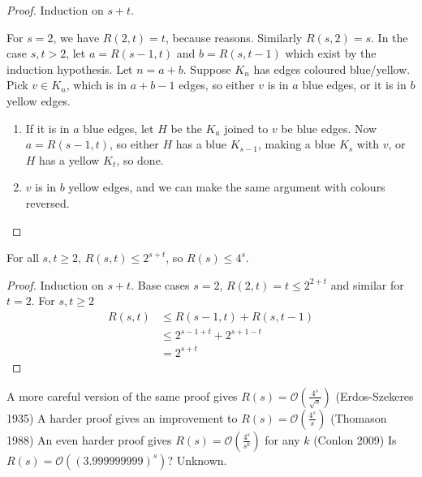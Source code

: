 \documentclass{article}
\begin{document}
\begin{proof}
    Induction on $s+t$.

    For $s=2$, we have $R(2, t) = t$, because reasons.  Similarly $R(s, 2) = s$.
    In the case $s, t > 2$, let $a = R(s-1, t)$ and $b = R(s, t-1)$ which exist by the induction hypothesis.  Let $n = a+b$. Suppose $K_n$ has edges coloured blue/yellow.
    Pick $v \in K_n$, which is in $a+b-1$ edges, so either $v$ is in $a$ blue edges, or it is in $b$ yellow edges.
    \begin{enumerate}
        \item If it is in $a$ blue edges, let $H$ be the $K_a$ joined to $v$ be blue edges.  Now $a = R(s-1, t)$, so either $H$ has a blue $K_{s-1}$, making a blue $K_s$ with $v$, or $H$ has a yellow $K_t$, so done.
        \item $v$ is in $b$ yellow edges, and we can make the same argument with colours reversed.
    \end{enumerate}
\end{proof}

\begin{cor}
    For all $s, t \geq 2$, $R(s, t) \leq 2^{s+t}$, so $R(s) \leq 4^s$.
\end{cor}

\begin{proof}
    Induction on $s + t$.  Base cases $s=2$, $R(2, t) = t \leq 2^{2+t}$ and similar for $t=2$.
    For $s, t \geq 2$
    \begin{align}
        R(s, t) &\leq R(s-1, t) + R(s, t-1) \\
                &\leq 2^{s-1+t} + 2^{s+1-t} \\
                &= 2^{s+t}
    \end{align}
\end{proof}

A more careful version of the same proof gives $R(s) = \mathcal{O} (\frac{4^s}{\sqrt{s}})$ (Erdos-Szekeres 1935)
A harder proof gives an improvement to $R(s) = \mathcal{O}(\frac{4^s}{s})$ (Thomason 1988)
An even harder proof gives $R(s) = \mathcal{O}(\frac{4^s}{s^k})$ for any $k$ (Conlon 2009)
Is $R(s) = \mathcal{O}((3.999999999)^s)$? Unknown.
\end{document}
